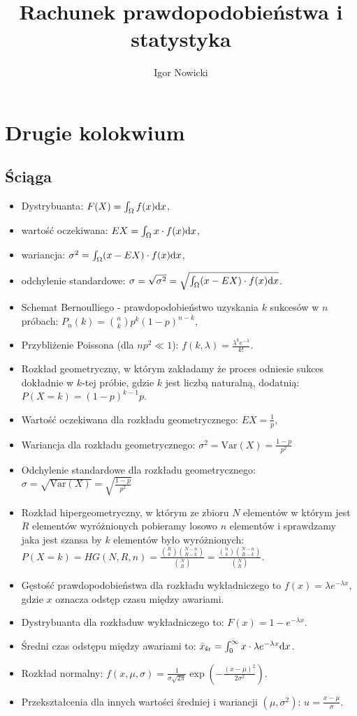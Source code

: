 \documentclass[11pt]{article}
\title{Rachunek prawdopodobieństwa i statystyka}
\author{Igor Nowicki}
\theoremstyle{definition}
\numberwithin{zadanie}{section}
\begin{document}
\maketitle
\tableofcontents

\section{Drugie kolokwium}
\subsection{Ściąga}

\begin{itemize}
    \item Dystrybuanta: $F(X) = \int_\Omega f(x)\text dx$,
    \item wartość oczekiwana: $EX = \int_\Omega x\cdot f(x)\text dx$,
    \item wariancja: $\sigma^2 = \int_\Omega(x-EX)\cdot f(x)\text dx$,
    \item odchylenie standardowe: $\sigma = \sqrt{\sigma^2} = \sqrt{\int_\Omega(x-EX)\cdot f(x)\text dx}$.
    \item Schemat Bernoulliego - prawdopodobieństwo uzyskania $k$ sukcesów w $n$ próbach: $P_n(k) = \binom nk p^k(1-p)^{n-k},$
    \item Przybliżenie Poissona (dla $np^2\ll 1$): $f(k,\lambda) = \frac{\lambda^ke^{-\lambda}}{k!}$.
    \item Rozkład geometryczny, w którym zakładamy że proces odniesie sukces dokładnie w $k$-tej próbie, gdzie $k$ jest liczbą naturalną, dodatnią: $P(X=k) = (1-p)^{k-1}p$.
    \item Wartość oczekiwana dla rozkładu geometrycznego: $EX = \frac1p,$
    \item Wariancja dla rozkładu geometrycznego:  $\sigma^2 = \text{Var}(X) = \frac{1-p}{p^2}$
    \item Odchylenie standardowe dla rozkładu geometrycznego:  $\sigma = \sqrt{\text{Var}(X)} = \sqrt{\frac{1-p}{p^2}}$
    \item Rozkład hipergeometryczny, w którym ze zbioru $N$ elementów w którym jest $R$ elementów wyróżnionych pobieramy losowo $n$ elementów i sprawdzamy jaka jest szansa by $k$ elementów było wyróżnionych:
          $P(X=k)=HG(N,R,n)=\frac{\binom Rk\binom{N-n}{R-k}}{\binom NR} = \frac{\binom nk\binom{N-n}{R-k}}{\binom NR}$.
    \item Gęstość prawdopodobieństwa dla rozkładu wykładniczego to $f(x)=\lambda e^{-\lambda x},$ gdzie $x$ oznacza odstęp czasu między awariami.
    \item Dystrybuanta dla rozkładuw wykładniczego to: $F(x) = 1-e^{-\lambda x}.$
    \item Średni czas odstępu między awariami to: $\bar x_{\text{śr}} = \int_0^\infty x\cdot \lambda e^{-\lambda x}\text dx$.
    \item Rozkład normalny: $f(x, \mu, \sigma) = \frac1{\sigma\sqrt{2\pi}}\exp(-\frac{(x-\mu)^2}{2\sigma^2})$.
    \item Przekształcenia dla innych wartości średniej i wariancji $(\mu, \sigma^2)$: $u=\frac{x-\mu}{\sigma}$.

\end{itemize}
\end{document}

